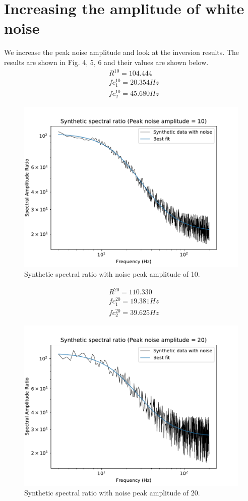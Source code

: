 \documentclass[11pt]{article}
\begin{document}
\section*{Increasing the amplitude of white noise}
We increase the peak noise amplitude and look at the inversion results. The results are shown in Fig. 4, 5, 6 and their values are shown below.
\begin{align*}
    &R^{10} = 104.444 \\
    &fc_1^{10} = 20.354 Hz \\
    &fc_2^{10} = 45.680 Hz
\end{align*}
\begin{figure}[!htb]
    \centering
    \includegraphics[scale=0.7]{fig_noise_3.pdf}
    \caption{Synthetic spectral ratio with noise peak amplitude of 10.}
\end{figure}
\begin{align*}
    &R^{20} = 110.330 \\
    &fc_1^{20} = 19.381 Hz \\
    &fc_2^{20} = 39.625 Hz
\end{align*}
\begin{figure}[!htb]
    \centering
    \includegraphics[scale=0.7]{fig_noise_4.pdf}
    \caption{Synthetic spectral ratio with noise peak amplitude of 20.}
\end{figure}
\end{document}
